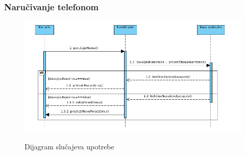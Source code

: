 \subsubsection{Naručivanje telefonom}

\begin{figure}[ht]
    \leavevmode
    \begin{center}
    \includegraphics[width=125mm]{slike/DijagramSekvenci.png}\\
    \end{center}
    \caption{Dijagram slučajeva upotrebe}
\end{figure}


